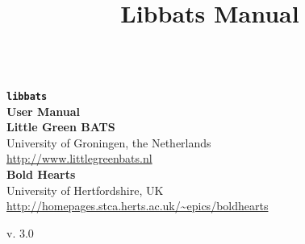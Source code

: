 \documentclass{scrbook}
\title{Libbats Manual}
\newcommand{\HRule}{\rule{\linewidth}{0.5mm}}
\begin{document}
\frontmatter

\begin{titlepage}
{\noindent
\vspace{2cm}\\
\textbf{
{\texttt{\Huge libbats}}\\[0.5cm]
{\textsf{\Huge User Manual}}\\[2.5cm]
}
 \textbf{\textsf{\Large Little Green BATS}}\\
 {\sf\large University of Groningen, the Netherlands}\\
 {\large\url{http://www.littlegreenbats.nl}}\\[0.5cm]
 \textbf{\textsf{\Large Bold Hearts}}\\
 {\sf\large University of Hertfordshire, UK}\\
 {\large\url{http://homepages.stca.herts.ac.uk/~epics/boldhearts}}\\[0.5cm]
\vfill
\begin{center}
{\sf\large v. 3.0}
\end{center}
}
\end{titlepage}

\tableofcontents

%

\mainmatter



%
%
%

%
%






%

\backmatter
%
%
%
%
\end{document}
